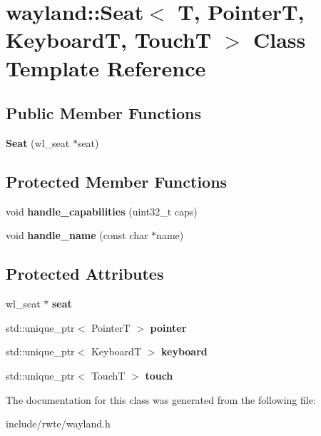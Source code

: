 \hypertarget{classwayland_1_1Seat}{}\section{wayland\+::Seat$<$ T, PointerT, KeyboardT, TouchT $>$ Class Template Reference}
\label{classwayland_1_1Seat}
\subsection*{Public Member Functions}
\begin{DoxyCompactItemize}
\item 
\mbox{\label{classwayland_1_1Seat_ae0d00ce4caa8f489bb8e2a73fba78ca6}} 
{\bfseries Seat} (wl\+\_\+seat $\ast$seat)
\end{DoxyCompactItemize}
\subsection*{Protected Member Functions}
\begin{DoxyCompactItemize}
\item 
\mbox{\label{classwayland_1_1Seat_ac76577b6205b399786a78fed6171ed9f}} 
void {\bfseries handle\+\_\+capabilities} (uint32\+\_\+t caps)
\item 
\mbox{\label{classwayland_1_1Seat_a761958cfc81d69c5fb32078c5edb7844}} 
void {\bfseries handle\+\_\+name} (const char $\ast$name)
\end{DoxyCompactItemize}
\subsection*{Protected Attributes}
\begin{DoxyCompactItemize}
\item 
\mbox{\label{classwayland_1_1Seat_ae7e5f3ba01babfa886996243a59d7ec3}} 
wl\+\_\+seat $\ast$ {\bfseries seat}
\item 
\mbox{\label{classwayland_1_1Seat_a16eef6f9e9a794f327919b3a2d48413a}} 
std\+::unique\+\_\+ptr$<$ PointerT $>$ {\bfseries pointer}
\item 
\mbox{\label{classwayland_1_1Seat_a1ce9ec505a29d7fd5a8bd7a86181c9a1}} 
std\+::unique\+\_\+ptr$<$ KeyboardT $>$ {\bfseries keyboard}
\item 
\mbox{\label{classwayland_1_1Seat_aea010d54006859d6298a709bbedc28c1}} 
std\+::unique\+\_\+ptr$<$ TouchT $>$ {\bfseries touch}
\end{DoxyCompactItemize}


The documentation for this class was generated from the following file\+:\begin{DoxyCompactItemize}
\item 
include/rwte/wayland.\+h\end{DoxyCompactItemize}
